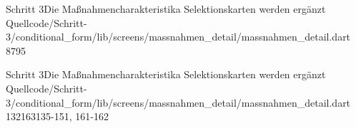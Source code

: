 \begin{alexlisting}{Schritt 3}{Die Maßnahmencharakteristika Selektionskarten werden ergänzt}
    {Quellcode/Schritt-3/conditional_form/lib/screens/massnahmen_detail/massnahmen_detail.dart}
    {87}{95}{}
    \label{lst:Schritt3DieMassnahmencharakteristikaSelektionskartenWerdenergaenzt}
\end{alexlisting}


\begin{alexlisting}{Schritt 3}{Die Maßnahmencharakteristika Selektionskarten werden ergänzt}
    {Quellcode/Schritt-3/conditional_form/lib/screens/massnahmen_detail/massnahmen_detail.dart}
    {132}{163}{135-151, 161-162}
    \label{lst:Schritt3DieMassnahmencharakteristikaSelektionskartenWerdenergaenzt}
\end{alexlisting}

